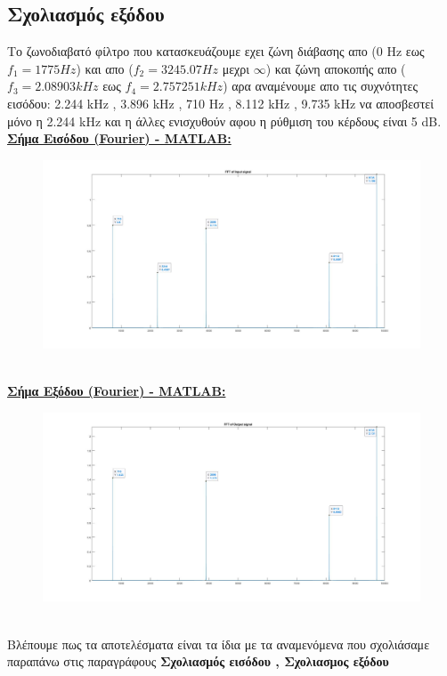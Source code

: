 \documentclass{article}
\begin{document}
{{\subsection*{Σχολιασμός εξόδου}
Το ζωνοδιαβατό φίλτρο που κατασκευάζουμε εχει ζώνη διάβασης απο (0 Hz εως $f_1 = 1775Hz$) και απο ($f_2 = 3245.07Hz$ μεχρι $\infty$) και ζώνη αποκοπής απο ($f_3 = 2.08903kHz$ εως $f_4 = 2.757251kHz$) αρα αναμένουμε απο τις συχνότητες εισόδου:  2.244 kHz , 3.896 kHz , 710 Hz , 8.112 kHz , 9.735 kHz να αποσβεστεί μόνο η 2.244 kHz και η άλλες ενισχυθούν αφου η ρύθμιση του κέρδους είναι 5 dB.
\clearpage
\textbf{\underline{Σήμα Εισόδου (Fourier) - MATLAB:}}
\begin{figure}[h!]
\centering
 	\advance\leftskip-0.5cm
  \includegraphics[width=130mm,scale=2]{thema3/multisim11.jpg}
\end{figure} \\[1.4\baselineskip]
\textbf{\underline{Σήμα Εξόδου (Fourier) - MATLAB:}}
\begin{figure}[h!]
\centering
 	\advance\leftskip-0.5cm
  \includegraphics[width=130mm,scale=2]{thema3/multisim12.jpg}
\end{figure} \\
Βλέπουμε πως τα αποτελέσματα είναι τα ίδια με τα αναμενόμενα που σχολιάσαμε παραπάνω στις παραγράφους\textbf{ Σχολιασμός εισόδου , Σχολιασμος εξόδου}
}}
\end{document}
